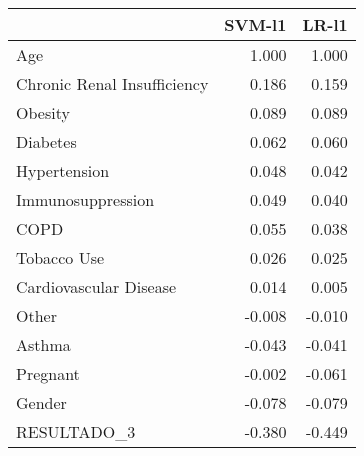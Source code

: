 \begin{tabular}{lrr}
\toprule
{} &  SVM-l1 &  LR-l1 \\
\midrule
Age                         &   1.000 &  1.000 \\
Chronic Renal Insufficiency &   0.186 &  0.159 \\
Obesity                     &   0.089 &  0.089 \\
Diabetes                    &   0.062 &  0.060 \\
Hypertension                &   0.048 &  0.042 \\
Immunosuppression           &   0.049 &  0.040 \\
COPD                        &   0.055 &  0.038 \\
Tobacco Use                 &   0.026 &  0.025 \\
Cardiovascular Disease      &   0.014 &  0.005 \\
Other                       &  -0.008 & -0.010 \\
Asthma                      &  -0.043 & -0.041 \\
Pregnant                    &  -0.002 & -0.061 \\
Gender                      &  -0.078 & -0.079 \\
RESULTADO\_3                 &  -0.380 & -0.449 \\
\bottomrule
\end{tabular}
